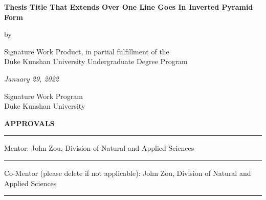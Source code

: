 \documentclass[11pt,a4paper,oneside]{report}
\begin{document}
\newcommand{\thetitle}{Thesis Title That Extends Over One Line Goes In Inverted Pyramid Form}

\newcommand{\submissiondate}{January 29, 2022}

\newcommand{\mentor}{John Zou}

\newcommand{\academicunit}{Division of Natural and Applied Sciences}



\begin{titlepage}

\vspace*{\bigskipamount}

\begin{center}
{\sffamily\LARGE\bfseries\MakeUppercase\thetitle\par}

\bigskip

by

\bigskip

{\Large \authorname}

\bigskip

Signature Work Product, in partial fulfillment of the \\
Duke Kunshan University Undergraduate Degree Program

\bigskip

\emph{\submissiondate}

\bigskip

Signature Work Program \\
Duke Kunshan University

\end{center}

\vfill

\textbf{\textsf{APPROVALS}}

\bigskip\bigskip\bigskip
\hrule

Mentor: \mentor, \academicunit

\bigskip\bigskip\bigskip
\hrule

Co-Mentor (please delete if not applicable): \mentor, \academicunit

\bigskip\bigskip\bigskip
\hrule

\end{titlepage}
\end{document}
